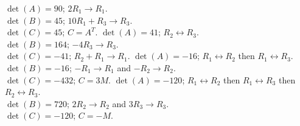 \begin{Answer}
\Question $\det(A)= 90$; $2R_1\rightarrow R_1$.\\ 
$\det(B)=45$; $10R_1+R_3\rightarrow R_3$.\\
$\det(C)=45 $; $C=A^T$.
\Question $\det(A)=41$; $R_2\leftrightarrow R_3$.\\
 $\det(B)=164$; $-4R_3\rightarrow R_3$.\\
 $\det(C)= -41 $; $R_2+R_1\rightarrow R_1$.
\Question $\det(A)= -16$; $R_1\leftrightarrow R_2$ then $R_1\leftrightarrow R_3$.\\
$\det(B)= -16$; $-R_1\rightarrow R_1$ and $-R_2\rightarrow R_2$.\\
$\det(C)= -432$; $C=3M$.
\Question $\det(A)= -120$; $R_1\leftrightarrow R_2$ then $R_1\leftrightarrow R_3$ then $R_2\leftrightarrow R_3$.\\
$\det(B)= 720$; $2R_2\rightarrow R_2$ and $3R_3\rightarrow R_3$.\\
$\det(C)= -120$; $C=-M$.
\end{Answer}
